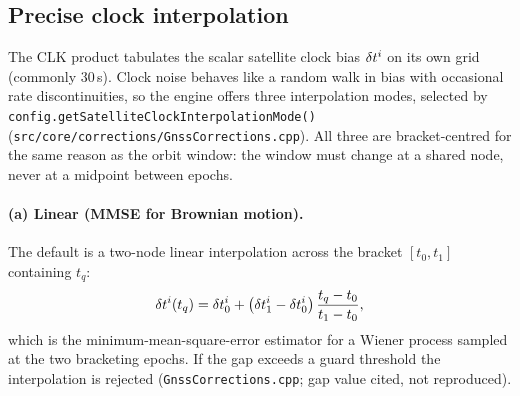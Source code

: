 \documentclass[main.tex]{subfiles}
\begin{document}
\subsection{Precise clock interpolation}\label{sec:prod-clock}

The CLK product tabulates the scalar satellite clock bias $\delta t^{i}$ on
its own grid (commonly $30$\,s).  Clock noise behaves like a random walk
in bias with occasional rate discontinuities, so the engine offers three
interpolation modes, selected by
\texttt{config.getSatelliteClockInterpolationMode()}
(\texttt{src/core/corrections/GnssCorrections.cpp}).  All three are
bracket-centred for the same reason as the orbit window: the window must
change at a shared node, never at a midpoint between epochs.

\paragraph{(a) Linear (MMSE for Brownian motion).}
The default is a two-node linear interpolation across the bracket
$[t_0,t_1]$ containing $t_q$:
\begin{equation}
\delta t^{i}(t_q)
=
\delta t^{i}_0
+
\bigl(\delta t^{i}_1-\delta t^{i}_0\bigr)\,
\frac{t_q-t_0}{t_1-t_0},
\label{eq:prod-clock-linear}
\end{equation}
which is the minimum-mean-square-error estimator for a Wiener process
sampled at the two bracketing epochs.  If the gap exceeds a guard
threshold the interpolation is rejected (\texttt{GnssCorrections.cpp};
gap value cited, not reproduced).
\end{document}
